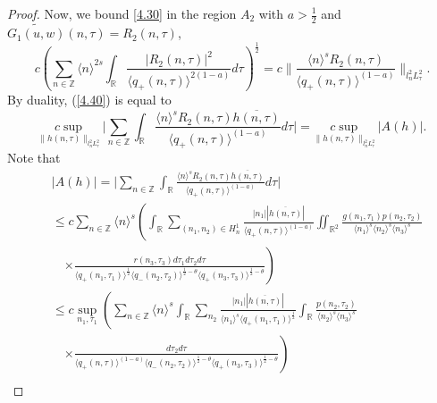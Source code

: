 \documentclass[reqno]{amsart}
\numberwithin{equation}{section}
\begin{document}
\begin{proof}
Now, we bound \eqref{4.30} in the region $A_{2}$ with $a>\frac{1}{2}$ and
$\widetilde{G_{1}(u,w)}(n,\tau)=R_{2}(n,\tau)$,
\begin{equation}\label{4.40}
c\left(  \sum\limits_{n\in\mathbb{Z}}\langle n\rangle^{2s}\int
\nolimits_{\mathbb{R}}\frac{| R_{2}(n,\tau)|
^{2}}{\langle q_{+}(n,\tau)\rangle^{2(1-a)}}d\tau\right)
^{\frac{1}{2}}=c\Big\|
\frac{\langle n\rangle^{s}R_{2}(n,\tau)}{\langle q_{+}(n,\tau)\rangle^{(1-a)}}
\Big\| _{l_{n}^{2}L_{\tau}^{2}}.
\end{equation}
By duality, (\ref{4.40}) is equal to
\begin{equation}\label{4.41}
\underset{\| h(n,\tau)\|_{l_{n}^{2}L_{\tau}^{2}}}{c\sup}\Big|
\sum\limits_{n\in\mathbb{Z}}\int\nolimits_{\mathbb{R}}\frac{\langle
n\rangle^{s}R_{2}(n,\tau)\overline{h(n,\tau)}}{\langle q_{+}(n,\tau)\rangle^{(1-a)}}d\tau\Big|
=\underset{\| h(n,\tau)\|_{l_{n}^{2}L_{\tau}^{2}}}{c\sup}|A(h)|.
\end{equation}
Note that
\begin{equation}\label{4.42}
\begin{split}
&|A(h)|=\Big|\sum\limits_{n\in\mathbb{Z}}\int\nolimits_{\mathbb{R}}\frac{\langle n\rangle^{s}R_{2}
(n,\tau)\overline{h(n,\tau)}}{\langle q_{+}(n,\tau)\rangle^{(1-a)}}d\tau\Big|\\
&\leq c\sum\limits_{n\in\mathbb{Z}}\langle n\rangle^{s}\left(
\int\nolimits_{\mathbb{R}}\sum\limits_{(n_{1},n_{2})\in H_{n}^{1}}\frac{| n_1| |\overline{h(n,\tau)}|}{\langle q_{+}(n,\tau)\rangle^{(1-a)}}
\iint\nolimits_{\mathbb{R}^{2}}\frac{g\left(  n_{1},\tau_{1}\right)  p(n_{2},\tau_{2})}{\langle n_{1}\rangle^{s}\langle n_{2}\rangle^{s}\langle n_3\rangle^{s}}\right.\\
&\quad \left.  \times\frac{r(n_3,\tau_3)d\tau_{1} d\tau_{2} d\tau}{\langle
q_{+}(n_{1},\tau_{1})\rangle^{\frac{1}{2}}\langle
q_{-}(n_{2},\tau_{2})\rangle^{\frac{1}{2}-\theta}\langle q_{+}(n_3,\tau_3)
\rangle^{\frac{1}{2}-\theta}}\right) \\
 & \leq c\underset{n_{1},\tau_{1}}{\sup}\left(  \sum\limits_{n\in\mathbb{Z}}\langle n\rangle^{s}\int\nolimits_{\mathbb{R}}\sum\limits_{n_{2}}\frac{| n_1| |\overline{h(n,\tau)}|}{\langle n_{1}\rangle^{s}\langle q_{+}(n_{1},\tau_{1})\rangle^{\frac{1}{2}}
}\int\nolimits_{\mathbb{R}}\frac{p(n_{2},\tau_{2})}{\langle
n_{2}\rangle
^{s}\langle n_3\rangle^{s}}\right.\\
&\quad\left.  \times\frac{d\tau_{2}d\tau}{\langle
q_{+}(n,\tau)\rangle ^{(1-a)}\langle
q_{-}(n_{2},\tau_{2})\rangle^{\frac{1}{2}-\theta}\langle
q_{+}(n_3,\tau_3)\rangle^{\frac{1}{2}-\theta}}\right)\\

\end{split}
\end{equation}
\end{proof}
\end{document}
